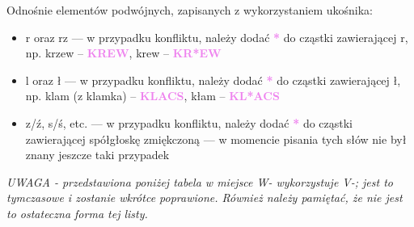 \documentclass[12p, oneside]{book}
\newcommand{\steno}[1]{\textbf{\textsf{\textcolor{violet}{ #1}}}}
\begin{document}
Odnośnie elementów podwójnych, zapisanych z wykorzystaniem ukośnika:
\begin{itemize}
	\item r oraz rz --- w przypadku konfliktu, należy dodać \steno{*} do
		cząstki zawierającej r, np. krzew -- \steno{KREW}, krew --
		\steno{KR*EW}
	\item l oraz ł --- w przypadku konfliktu, należy dodać \steno{*} do
		cząstki zawierającej ł, np. klam (z klamka) -- \steno{KLACS},
		kłam -- \steno{KL*ACS}
	\item z/ź, s/ś, etc. --- w przypadku konfliktu, należy dodać \steno{*}
		do cząstki zawierającej spółgłoskę zmiękczoną --- w momencie
		pisania tych słów nie był znany jeszcze taki przypadek
\end{itemize}

\emph{UWAGA - przedstawiona poniżej tabela w miejsce W- wykorzystuje V-; jest to tymczasowe i zostanie wkrótce poprawione. Również należy pamiętać, że nie jest to ostateczna forma tej listy.}
\end{document}
